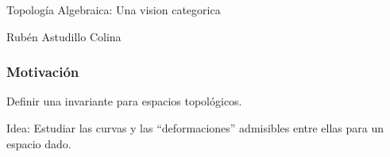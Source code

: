 \documentclass[xetex,mathserif,serif]{beamer}
\begin{document}
  \begin{frame}
    \begin{block}{}
      \centering
      Topología Algebraica: Una vision categorica
    \end{block}
    \begin{block}{}
      \centering
      Rubén Astudillo Colina
    \end{block}

  \end{frame}

  \begin{frame}
    \frametitle{Motivación}

    \begin{block}{}
      Definir una invariante para espacios topológicos.
    \end{block}

    \pause

    \begin{block}{}
      Idea: Estudiar las curvas y las ``deformaciones'' admisibles entre
      ellas para un espacio dado.
    \end{block}
  \end{frame}
\end{document}
